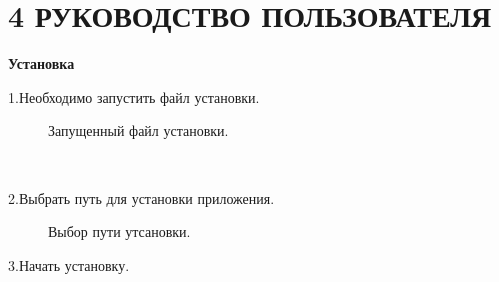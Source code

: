 \documentclass[14pt,a4paper]{extreport}
\begin{document}
	\section*{\normalsize\hspace{4ex}4 РУКОВОДСТВО ПОЛЬЗОВАТЕЛЯ}
	\par\textbf{Установка}
    \\ \par1.Необходимо запустить файл установки.
    \begin{figure}[h]
    \caption{Запущенный файл установки.}
    \label{ris:image}
    \end{figure}
    \\ \par2.Выбрать путь для установки приложения.
    \begin{figure}[h]
    \caption{Выбор пути утсановки.}
    \label{ris:image}
    \end{figure}
    \newpage
     \par3.Начать установку.
\end{document}

